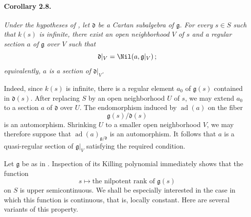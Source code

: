 
\paragraph{\textbf{Corollary 2.8.}}
\emph{Under the hypotheses of , let \(\mathfrak d\) be a Cartan
subalgebra of \(\mathfrak g\). For every \(s\in S\) such that
\(k(s)\) is infinite, there exist an open neighborhood \(V\) of
\(s\) and a regular section \(a\) of \(\mathfrak g\) over \(V\)
such that
\[
  \mathfrak d|_V=\Nil\!\left(a,\mathfrak g|_V\right);
\]
equivalently, \(a\) is a section of \(\mathfrak d|_V\).}

Indeed, since \(k(s)\) is infinite, there is a regular element
\(a_0\) of \(\mathfrak g(s)\) contained in \(\mathfrak d(s)\).
After replacing \(S\) by an open neighborhood \(U\) of \(s\), we
may extend \(a_0\) to a section \(a\) of \(\mathfrak d\) over
\(U\). The endomorphism induced by \(\operatorname{ad}(a)\) on the
fiber
\[
  \mathfrak g(s)/\mathfrak d(s)
\]
is an automorphism. Shrinking \(U\) to a smaller open neighborhood
\(V\), we may therefore suppose that
\(\operatorname{ad}(a)_{\mathfrak g/\mathfrak d}\) is an
automorphism. It follows that \(a\) is a quasi-regular section of
\(\mathfrak g|_V\) satisfying the required condition.

Let \(\mathfrak g\) be as in . Inspection of its Killing
polynomial immediately shows that the function
\[
  s\longmapsto\text{the nilpotent rank of }\mathfrak g(s)
\]
on \(S\) is upper semicontinuous. We shall be especially interested
in the case in which this function is continuous, that is, locally
constant. Here are several variants of this property.
